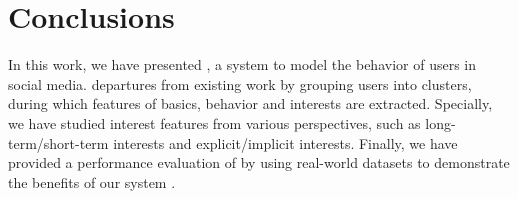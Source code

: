 \section{Conclusions}
\label{sec:conclu}

In this work, we have presented \sys{}, a system to model the \retg{} behavior of users in social media.
\sys{} departures from existing work by grouping users into clusters, during which features of basics, behavior and interests are extracted.
Specially, we have studied interest features from various perspectives, such as long-term/short-term interests and explicit/implicit interests.
Finally, we have provided a performance evaluation of \sys{} by using real-world datasets to demonstrate the benefits of our system \sys{}.

